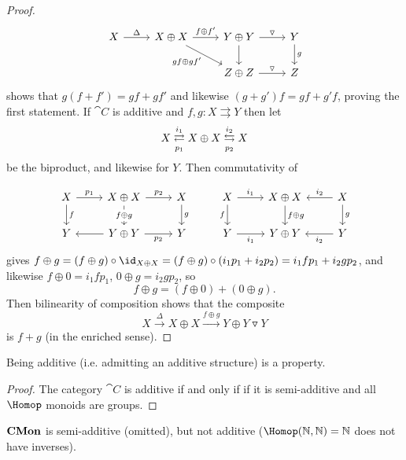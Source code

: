 \documentclass[../main.tex]{subfiles}
\begin{document}
\begin{proof}
\[\begin{tikzcd}
	X & {X\oplus X} & {Y\oplus Y} & Y \\
	&& {Z\oplus Z} & Z
	\arrow["{gf\oplus gf'}"', from=1-2, to=2-3]
	\arrow[from=1-3, to=2-3]
	\arrow["\triangledown", from=1-3, to=1-4]
	\arrow["g", from=1-4, to=2-4]
	\arrow["\triangledown", from=2-3, to=2-4]
	\arrow["{f\oplus f'}", from=1-2, to=1-3]
	\arrow["\Delta", from=1-1, to=1-2]
\end{tikzcd}\]
shows that $g(f+ f') = gf + gf'$ and likewise $(g + g')f = gf + g'f$, proving the first statement.
	If $\cat C$ is additive and $f,g: X \rightrightarrows Y$ then let
	\[
    	X \xrightleftarrows{i_1}[p_1] X \oplus X \xleftrightarrows{i_2}[p_2] X
    \] be the biproduct, and likewise for $Y$. Then commutativity of 
	
\[\begin{tikzcd}
	X & {X\oplus X} & X & X & {X\oplus X} & X \\
	Y & {Y\oplus Y} & Y & Y & {Y\oplus Y} & Y
	\arrow["f", from=1-1, to=2-1]
	\arrow["{p_1}", from=1-1, to=1-2]
	\arrow["{p_2}", from=1-2, to=1-3]
	\arrow["g", from=1-3, to=2-3]
	\arrow["{p_2}"', from=2-2, to=2-3]
	\arrow[from=2-2, to=2-1]
	\arrow["{f\oplus g}"{description}, from=1-2, to=2-2]
	\arrow["f"', from=1-4, to=2-4]
	\arrow["{i_1}"', from=2-4, to=2-5]
	\arrow["{i_1}", from=1-4, to=1-5]
	\arrow["{i_2}"', from=1-6, to=1-5]
	\arrow["{i_2}", from=2-6, to=2-5]
	\arrow["g", from=1-6, to=2-6]
	\arrow["{f\oplus g}", from=1-5, to=2-5]
\end{tikzcd}\]
gives $f \oplus g = (f \oplus g) \circ \id_{X \oplus X} = (f \oplus g) \circ (i_1 p_1 + i_2 p_2) = i_1 f p_1 + i_2 g p_2$, and likewise $f \oplus 0 = i_1 f p_1$, $0 \oplus g = i_2 g p_2$, so \[
    	f \oplus g = (f \oplus 0) + (0 \oplus g).
    \] Then bilinearity of composition shows that the composite
	\[
    	X \xrightarrow{\Delta} X \oplus X \xrightarrow{f \oplus g} Y \oplus Y \triangledown Y
    \] is $f + g$ (in the enriched sense).
\end{proof}
\begin{cor}
	Being additive (i.e. admitting an additive structure) is a property.
\end{cor}
\begin{proof}
	The category $\cat C$ is additive if and only if if it is semi-additive and all $\Hom$ monoids are groups.
\end{proof}

\begin{exmp}
	$\mathbf{CMon}$ is semi-additive (omitted), but not additive ($\Hom(\bb N, \bb N) = \bb N$ does not have inverses).
\end{exmp}
\end{document}

